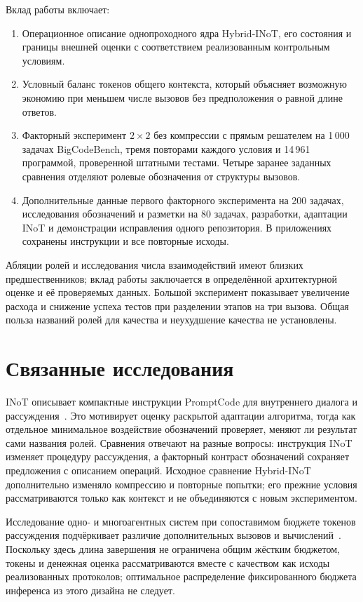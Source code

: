 Вклад работы включает:
\begin{enumerate}
\item Операционное описание однопроходного ядра Hybrid-INoT, его состояния и границы внешней оценки с соответствием реализованным контрольным условиям.
\item Условный баланс токенов общего контекста, который объясняет возможную экономию при меньшем числе вызовов без предположения о равной длине ответов.
\item Факторный эксперимент $2\times2$ без компрессии с прямым решателем на 1\,000 задачах BigCodeBench, тремя повторами каждого условия и 14\,961 программой, проверенной штатными тестами. Четыре заранее заданных сравнения отделяют ролевые обозначения от структуры вызовов.
\item Дополнительные данные первого факторного эксперимента на 200 задачах, исследования обозначений и разметки на 80 задачах, разработки, адаптации INoT и демонстрации исправления одного репозитория. В приложениях сохранены инструкции и все повторные исходы.
\end{enumerate}
Абляции ролей и исследования числа взаимодействий имеют близких предшественников; вклад работы заключается в определённой архитектурной оценке и её проверяемых данных. Большой эксперимент показывает увеличение расхода и снижение успеха тестов при разделении этапов на три вызова. Общая польза названий ролей для качества и неухудшение качества не установлены.

\section{Связанные исследования}
\label{sec:heldout-related}

INoT описывает компактные инструкции PromptCode для внутреннего диалога и рассуждения~\cite{sun2025inot}. Это мотивирует оценку раскрытой адаптации алгоритма, тогда как отдельное минимальное воздействие обозначений проверяет, меняют ли результат сами названия ролей. Сравнения отвечают на разные вопросы: инструкция INoT изменяет процедуру рассуждения, а факторный контраст обозначений сохраняет предложения с описанием операций. Исходное сравнение Hybrid-INoT дополнительно изменяло компрессию и повторные попытки; его прежние условия рассматриваются только как контекст и не объединяются с новым экспериментом.

Исследование одно- и многоагентных систем при сопоставимом бюджете токенов рассуждения подчёркивает различие дополнительных вызовов и вычислений~\cite{tran2026budget}. Поскольку здесь длина завершения не ограничена общим жёстким бюджетом, токены и денежная оценка рассматриваются вместе с качеством как исходы реализованных протоколов; оптимальное распределение фиксированного бюджета инференса из этого дизайна не следует.

